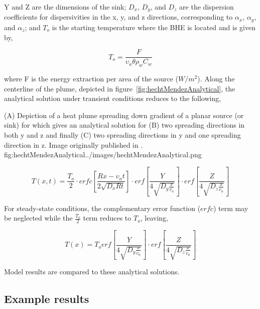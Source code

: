 Y and Z are the dimensions of the sink; $D_x$, $D_y$, and $D_z$ are the dispersion coefficients for dispersivities in the x, y, and z directions, corresponding to $\alpha_x$, $\alpha_y$, and $\alpha_z$; and $T_o$ is the starting temperature where the BHE is located and is given by,

\begin{equation*}
T_o = \frac{F}{\upsilon_a \theta \rho_w C_w}
\end{equation*}
 
where F is the energy extraction per area of the source ($W/m^2$).  Along the centerline of the plume, depicted in figure~\ref{fig:hechtMendezAnalytical}, the analytical solution under transient conditions reduces to the following,

\begin{StandardFigure}{
                                     (A) Depiction of a heat plume spreading down gradient of a planar source (or sink) for which \citep{domenico1985} gives an analytical solution for (B) two spreading directions in both y and z and finally (C) two spreading directions in y and one spreading direction in z.  Image originally published in \cite{hecht2008}.
                                     }{fig:hechtMendezAnalytical}{../images/hechtMendezAnalytical.png}
\end{StandardFigure}       

\begin{equation*}
T \left( x, t \right) = \frac{T_o}{2} \cdot erfc \left[ \frac{Rx - \upsilon_a t}{2 \sqrt{D_x R t}} \right] \cdot erf \left[ \frac{ Y }{4 \sqrt{D_y \frac{x}{v_a}}} \right] \cdot  erf \left[ \frac{ Z }{4 \sqrt{D_z \frac{x}{v_a}}} \right] 
\end{equation*}
 
For steady-state conditions, the complementary error function ($erfc$) term may be neglected while the $\frac {T_o}{2}$ term reduces to $T_o$, leaving,

\begin{equation*}
T \left( x \right) = T_o erf \left[ \frac{ Y }{4 \sqrt{D_y \frac{x}{v_a}}} \right] \cdot  erf \left[ \frac{ Z }{4 \sqrt{D_z \frac{x}{v_a}}} \right] 
\end{equation*}

Model results are compared to these analytical solutions.  

\subsection{Example results}

